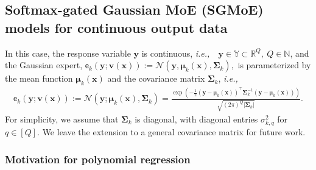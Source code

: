 \documentclass{article}
\newcommand{\Mdg}{Softmax-gated Gaussian MoE }
\def\ie{{\em i.e.,~}}
\newcommand{\cN}{\mathcal{N}}
\def\nset{{\mathbb{N}}}
\def\ex{\mathsf{e}}
\def\rvy{{\mathbf{y}}}
\def\vmu{{\bm{\mu}}}
\def\vv{{\bm{v}}}
\def\vx{{\bm{x}}}
\def\vy{{\bm{y}}}
\def\mSigma{{\bm{\Sigma}}}
\def\sR{{\mathbb{R}}}
\def\sY{{\mathbb{Y}}}
\begin{document}
\subsection{\Mdg (SGMoE) models for continuous output data} \label{sec_SGMoE}
In this case, the response variable $\rvy$ is continuous, \ie~$\rvy\in \sY \subset \sR^Q,~ Q \in \nset$, and the Gaussian expert, $\ex_k(\vy;\vv(\vx)) := \cN(\vy, \vmu_k(\vx), \mSigma_k),$ is parameterized by the mean function $ \vmu_k(\vx)$ and the covariance matrix $\mSigma_k$, \ie
\begin{align*}
    \ex_k(\vy;\vv(\vx)) :=\cN(\vy;\vmu_k(\vx),\mSigma_k) = \frac{\exp \left(-\frac{1}{2}(\vy - \vmu_k(\vx))^\top \mSigma_k^{-1} (\vy - \vmu_k(\vx))\right)}{\sqrt{(2\pi)^Q \lvert \mSigma_k \rvert}}.
\end{align*}
For simplicity, we assume that $\mSigma_k$ is diagonal, with diagonal entries $\sigma_{k,q}^2$ for $q\in[Q]$. We leave the extension to a general covariance matrix for future work.

\subsubsection{Motivation for polynomial regression}\label{section_polynomial_regression}
\end{document}
